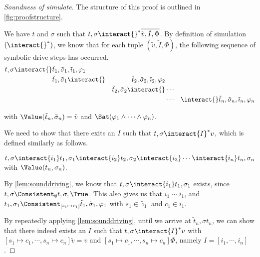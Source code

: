 \begin{proof}[Soundness of simulate]
  The structure of this proof is outlined in \cref{fig:proofstructure}.

  We have $t$ and $\sigma$ such that $t,\sigma\interact{}^*\overline{\tilde{v},\tilde{I},\Phi}$.
  By definition of simulation $(\interact{}^*)$, we know that for each tuple $(\tilde{v},\tilde{I},\Phi)$,
  the following sequence of symbolic drive steps has occurred.
  \begin{align*}
      t,\sigma\interact{}&\tilde{t}_1,\tilde{\sigma}_1,\tilde{\imath}_1,\phi_1&\\
                      &\tilde{t}_1,\tilde{\sigma}_1\interact{}&\tilde{t}_2,\tilde{\sigma}_2,\tilde{\imath}_2,\phi_2\\
                      &                                    &\tilde{t}_2,\tilde{\sigma}_2\interact{}&\cdots&\\
                      &                                    &                                    &\cdots&
                      \interact{}\tilde{t}_n,\tilde{\sigma}_n,\tilde{\imath}_n,\phi_n
  \end{align*}

  with $\Value(\tilde{t}_n,\tilde{\sigma}_n)=\tilde{v}$ and $\Sat(\phi_1\land\cdots\land\phi_n)$.

  We need to show that there exits an $I$ such that $t,\sigma\interact{I}^*v$, which is defined similarly as follows.

  $t,\sigma\interact{i_1}t_1,\sigma_1\interact{i_2}t_2,\sigma_2\interact{i_3}\cdots \interact{i_n}t_n,\sigma_n$ with $\Value(t_n,\sigma_n)$.

  By \cref{lem:sounddriving}, we know that $t,\sigma\interact{i_1}t_1,\sigma_1$ exists, since $t,\sigma\Consistent_{\emptyset}t,\sigma,\True$.
  This also gives us that $\tilde{i_1}\sim i_1$, and $t_1,\sigma_1\Consistent_{[s_1\mapsto c_1]}\tilde{t}_1,\tilde{\sigma}_1,\phi_1$ with $s_1\in\tilde{\imath}_1$ and $c_1\in i_1$.

  By repeatedly applying \cref{lem:sounddriving}, until we arrive at $\tilde{t}_n,\sigma{t}_n$,
  we can show that there indeed exists an $I$ such that $t,\sigma\interact{I}^*v$ with $[s_1\mapsto c_1,\cdots,s_n\mapsto c_n]\tilde{v}=v$
  and $[s_1\mapsto c_1,\cdots,s_n\mapsto c_n]\Phi$, namely $I=[i_1,\cdots,i_n]$.

\end{proof}



